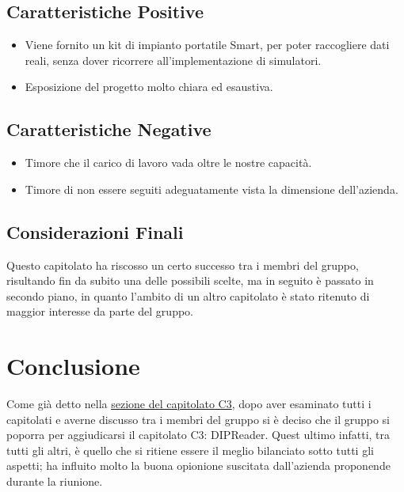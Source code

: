 \documentclass[a4paper,12pt]{article}
\begin{document}
    \subsection{Caratteristiche Positive}
    \begin{itemize}
		\item Viene fornito un kit di impianto portatile Smart, per poter raccogliere dati reali, senza dover ricorrere all’implementazione di simulatori.
		\item Esposizione del progetto molto chiara ed esaustiva.
    \end{itemize}
    \subsection{Caratteristiche Negative}
    \begin{itemize}
        \item Timore che il carico di lavoro vada oltre le nostre capacità.
        \item Timore di non essere seguiti adeguatamente vista la dimensione dell'azienda. 
    \end{itemize}
    \subsection{Considerazioni Finali}
    Questo capitolato ha riscosso un certo successo tra i membri del gruppo, risultando fin da subito una delle possibili scelte, ma in seguito è passato in secondo piano, in quanto l’ambito di un altro capitolato è stato ritenuto di maggior interesse da parte del gruppo.


    \section{Conclusione}
    Come già detto nella \hyperref[sec:C3]{sezione del capitolato C3}, dopo aver esaminato tutti i capitolati e averne discusso tra i membri del gruppo si è deciso che il gruppo si poporra per aggiudicarsi il capitolato C3: DIPReader. Quest ultimo infatti, tra tutti gli altri, è quello che si ritiene essere il meglio bilanciato sotto tutti gli aspetti; ha influito molto la buona opionione suscitata dall'azienda proponende durante la riunione.
\end{document}
